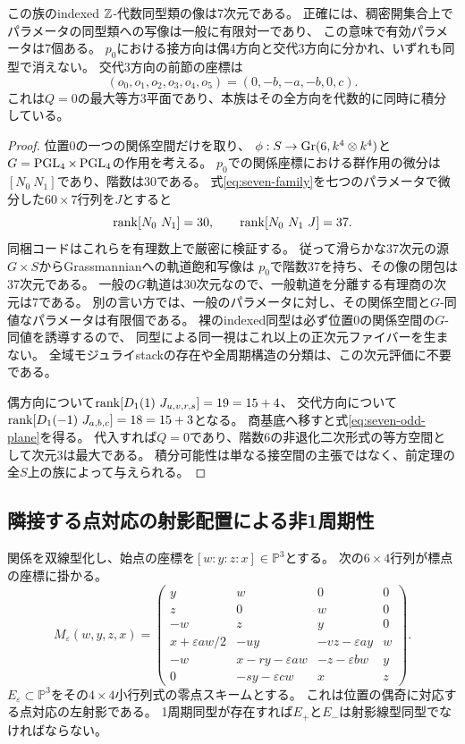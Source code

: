 \begin{theorem}\label{thm:seven-image}
この族のindexed $\mathbb Z$-代数同型類の像は7次元である。
正確には、稠密開集合上でパラメータの同型類への写像は一般に有限対一であり、
この意味で有効パラメータは7個ある。
$p_0$における接方向は偶4方向と交代3方向に分かれ、いずれも同型で消えない。
交代3方向の前節の座標は
\begin{equation}\label{eq:seven-odd-plane}
 (o_0,o_1,o_2,o_3,o_4,o_5)=(0,-b,-a,-b,0,c).
\end{equation}
これは$Q=0$の最大等方3平面であり、本族はその全方向を代数的に同時に積分している。
\end{theorem}
\begin{proof}
位置0の一つの関係空間だけを取り、
$\phi:S\to\operatorname{Gr}(6,k^4\otimes k^4)$と
$G=\operatorname{PGL}_4\times\operatorname{PGL}_4$の作用を考える。
$p_0$での関係座標における群作用の微分は$[N_0\ N_1]$であり、階数は30である。
式\eqref{eq:seven-family}を七つのパラメータで微分した$60\times7$行列を$J$とすると
\[
 \rk[N_0\ N_1]=30,\qquad \rk[N_0\ N_1\ J]=37.
\]
同梱コードはこれらを有理数上で厳密に検証する。
従って滑らかな37次元の源$G\times S$からGrassmannianへの軌道飽和写像は
$p_0$で階数37を持ち、その像の閉包は37次元である。
一般の$G$軌道は30次元なので、一般軌道を分離する有理商の次元は7である。
別の言い方では、一般のパラメータに対し、その関係空間と$G$-同値なパラメータは有限個である。
裸のindexed同型は必ず位置0の関係空間の$G$-同値を誘導するので、
同型による同一視はこれ以上の正次元ファイバーを生まない。
全域モジュライstackの存在や全周期構造の分類は、この次元評価に不要である。

偶方向について$\rk[D_1(1)\ J_{u,v,r,s}]=19=15+4$、
交代方向について$\operatorname{rank}[D_1(-1)\ J_{a,b,c}]=18=15+3$となる。
商基底へ移すと式\eqref{eq:seven-odd-plane}を得る。
代入すれば$Q=0$であり、階数6の非退化二次形式の等方空間として次元3は最大である。
積分可能性は単なる接空間の主張ではなく、前定理の全$S$上の族によって与えられる。
\end{proof}

\subsection{隣接する点対応の射影配置による非1周期性}
関係を双線型化し、始点の座標を$[w:y:z:x]\in\mathbb P^3$とする。
次の$6\times4$行列が標点の座標に掛かる。
\begin{equation}\label{eq:seven-point-matrix}
 M_\varepsilon(w,y,z,x)=
 \begin{pmatrix}
 y&w&0&0\\z&0&w&0\\-w&z&y&0\\
 x+\varepsilon aw/2&-uy&-vz-\varepsilon ay&w\\
 -w&x-ry-\varepsilon aw&-z-\varepsilon bw&y\\
 0&-sy-\varepsilon cw&x&z
 \end{pmatrix}.
\end{equation}
$E_\varepsilon\subset\mathbb P^3$をその$4\times4$小行列式の零点スキームとする。
これは位置の偶奇に対応する点対応の左射影である。
1周期同型が存在すれば$E_+$と$E_-$は射影線型同型でなければならない。

